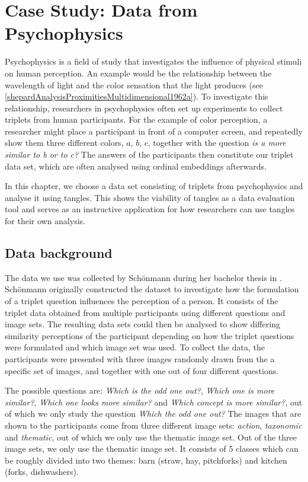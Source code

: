 \chapter{Case Study: Data from Psychophysics}\label{real}
Psychophysics is a field of study that investigates the influence of physical stimuli on human perception. An example would be the relationship between the wavelength of 
light and the color sensation that the light produces (see \autoref{shepardAnalysisProximitiesMultidimensional1962a}). To investigate this relationship, researchers in psychophysics
often set up experiments to collect triplets from human participants. For the example of color perception, a researcher might place a participant in front of a computer 
screen, and repeatedly show them three different colors, $a$, $b$, $c$, together with the question \textit{is a more similar to b or to c?} 
The answers of the participants then constitute our triplet data set, which are often analysed using ordinal embeddings afterwards.

In this chapter, we choose a data set consisting of triplets from psychophysics and analyse it using tangles. 
This shows the viability of tangles as a data evaluation tool and serves as an 
instructive application for how researchers can use tangles for their own analysis. 

\section{Data background}
The data we use was collected by Schönmann during her bachelor thesis in \cite{inesschonmannSimilarityJudgementsNatural2021}. Schönmann originally
constructed the dataset to investigate how the formulation of a triplet question influences 
the perception of a person. It consists of the triplet data obtained from multiple
participants using different questions and image sets. The resulting data sets could then be analysed to show differing similarity perceptions of the
participant depending on how the triplet questions were formulated and which image set was used.
To collect the data, the participants were presented with three images randomly drawn from the a specific set of images, and together with one out of four different questions. 

The possible questions are: \textit{Which is the odd one out?}, \textit{Which one is more similar?},
\textit{Which one looks more similar?} and \textit{Which concept is more similar?}, out of which we only study the question \textit{Which the odd one out?} 
The images that are shown to the participants come from three different image sets: \textit{action}, \textit{taxonomic} and \textit{thematic}, out of which we only use the thematic image set.
Out of the three image sets, we only use the thematic image set. It consists of 5 classes which can be roughly divided into two themes: barn (straw, hay, pitchforks) and kitchen (forks, dishwashers).

